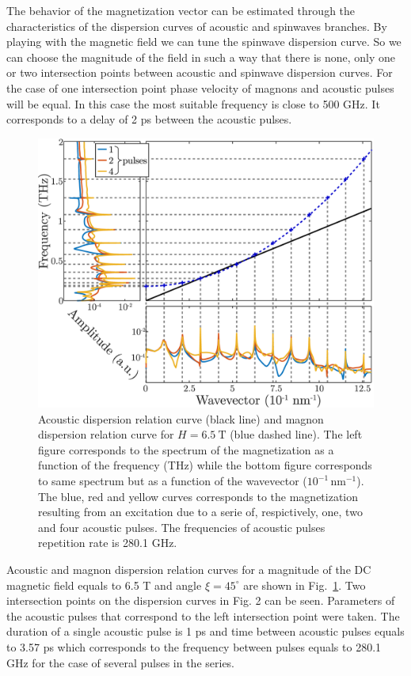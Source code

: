 \documentclass[%
superscriptaddress,
preprint,
showpacs,
amsmath,
amssymb,
aps,
prl,
]{revtex4-1}
\begin{document}
	
The behavior of the magnetization vector can be estimated through the characteristics of the dispersion curves of acoustic and spinwaves branches. By playing with the magnetic field we can tune the spinwave dispersion curve. So we can choose the magnitude of the field in such a way that there is none, only one or two intersection points between acoustic and spinwave dispersion curves. For the case of one intersection point phase velocity of magnons and acoustic pulses will be equal. In this case the most suitable frequency is close to 500 GHz. It corresponds to a delay of 2 ps between the acoustic pulses.
	
\begin{figure}[ht]
	\centering
	\includegraphics[width=0.95\columnwidth]{Figures/dispersionRelation-H6.5T-Ni30nm-3.57_2ps.eps}
	\caption{Acoustic dispersion relation curve (black line) and magnon dispersion relation curve for $H = 6.5\ \mathrm{T}$ (blue dashed line). The left figure corresponds to the spectrum of the magnetization as a function of the frequency (THz) while the bottom figure corresponds to same spectrum but as a function of the wavevector ($10^{-1}\, \mathrm{nm}^{-1}$). The blue, red and yellow curves corresponds to the magnetization resulting from an excitation due to a serie of, respictively, one, two and four acoustic pulses. The frequencies of acoustic pulses repetition rate is 280.1 GHz.}
	\label{fig:dispersionRelationHNi}
\end{figure}
	
Acoustic and magnon dispersion relation curves for a magnitude of the DC magnetic field equals to 6.5 T and angle $\xi = 45^{\circ}$  are shown in Fig.~\ref{fig:dispersionRelationHNi}. Two intersection points on the dispersion curves in Fig. 2 can be seen. Parameters of the acoustic pulses that correspond to the left intersection point were taken. The duration of a single acoustic pulse is 1 ps and time between acoustic pulses equals to 3.57 ps which corresponds to the frequency between pulses equals to 280.1 GHz for the case of several pulses in the series.
	
\end{document}
